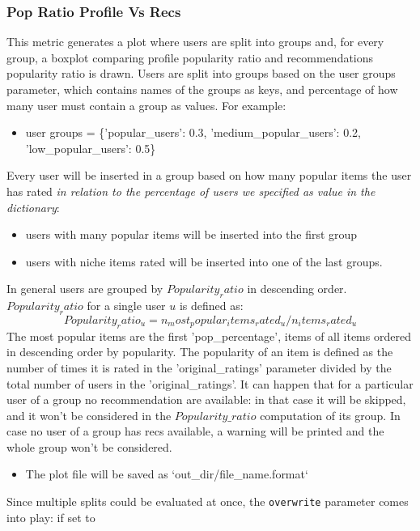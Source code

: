 \subsubsection{Pop Ratio Profile Vs Recs}\label{subsubsec:popratio}
This metric generates a plot where users are split into groups and, for every group, a boxplot comparing
profile popularity ratio and recommendations popularity ratio is drawn.
Users are split into groups based on the user groups parameter, which contains names of the groups as keys,
and percentage of how many user must contain a group as values.
For example:
\begin{itemize}
       \item user groups = \{'popular\_users': 0.3, 'medium\_popular\_users': 0.2, 'low\_popular\_users': 0.5\}
\end{itemize}
\hfill\break
\hfill\break
Every user will be inserted in a group based on how many popular items the user has rated
\textit{in relation to the percentage of users we specified as value in the dictionary}:
\begin{itemize}
    \item users with many popular items will be inserted into the first group
    \item users with niche items rated will be inserted into one of the last groups.
\end{itemize}
\hfill\break
\hfill\break
In general users are grouped by $Popularity_ratio$ in descending order. $Popularity_ratio$ for a single user $u$
is defined as:
\hfill\break
\hfill\break
    \[
        Popularity_ratio_u = n_most_popular_items_rated_u / n_items_rated_u
    \]
\hfill\break
\hfill\break
The most popular items are the first 'pop\_percentage', items of all items ordered in descending order by
popularity.
The popularity of an item is defined as the number of times it is rated in the 'original\_ratings' parameter
divided by the total number of users in the 'original\_ratings'.
It can happen that for a particular user of a group no recommendation are available: in that case it will be skipped,
and it won't be considered in the $Popularity\_ratio$ computation of its group.
In case no user of a group has recs available, a warning will be printed and the whole group won't be considered.
\begin{itemize}
    \item The plot file will be saved as `out\_dir/file\_name.format`
\end{itemize}
\hfill\break
\hfill\break
Since multiple splits could be evaluated at once, the \texttt{overwrite} parameter comes into play: if set to
